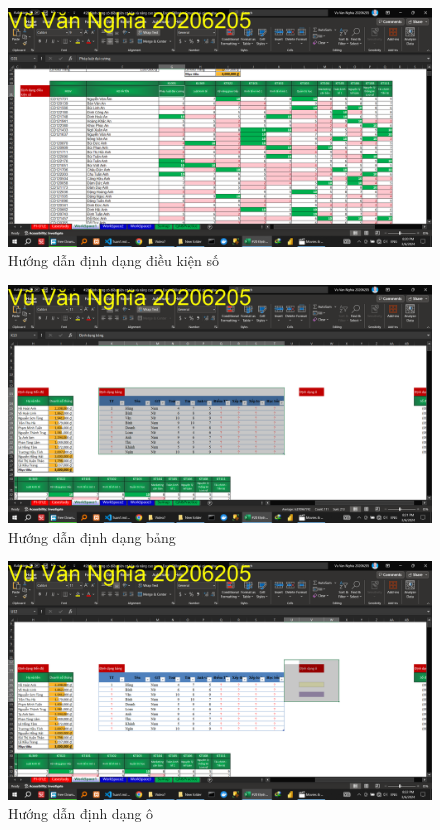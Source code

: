 \documentclass{article}
\begin{document}
\begin{figure}[H]
\centering
\includegraphics[scale = 0.15]{Video7/HuongDan/2.png}
\caption{Hướng dẫn định dạng điều kiện số}
\end{figure}

\begin{figure}[H]
\centering
\includegraphics[scale = 0.15]{Video7/HuongDan/3.png}
\caption{Hướng dẫn định dạng bảng}
\end{figure}

\begin{figure}[H]
\centering
\includegraphics[scale = 0.15]{Video7/HuongDan/4.png}
\caption{Hướng dẫn định dạng ô}
\end{figure}
\end{document}
